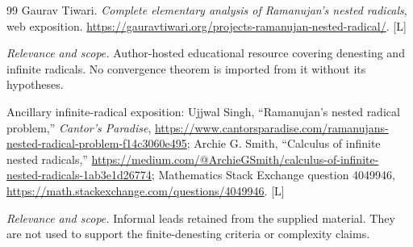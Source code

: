 \documentclass[11pt,oneside]{article}
\numberwithin{equation}{section}
\theoremstyle{definition}
\theoremstyle{remark}
\newcommand{\status}[1]{\textsf{\small[#1]}}
\newcommand{\entrynote}[1]{\par\smallskip\noindent\emph{Relevance and scope.} #1}
\begin{document}
\begin{thebibliography}{99}
Gaurav Tiwari. \emph{Complete elementary analysis of Ramanujan's nested radicals}, web exposition. \url{https://gauravtiwari.org/projects-ramanujan-nested-radical/}. \status{L}
\entrynote{Author-hosted educational resource covering denesting and infinite radicals. No convergence theorem is imported from it without its hypotheses.}

Ancillary infinite-radical exposition: Ujjwal Singh, ``Ramanujan's nested radical problem,'' \emph{Cantor's Paradise}, \url{https://www.cantorsparadise.com/ramanujans-nested-radical-problem-f14c3060e495}; Archie G. Smith, ``Calculus of infinite nested radicals,'' \url{https://medium.com/@ArchieGSmith/calculus-of-infinite-nested-radicals-1ab3e1d26774}; Mathematics Stack Exchange question 4049946, \url{https://math.stackexchange.com/questions/4049946}. \status{L}
\entrynote{Informal leads retained from the supplied material. They are not used to support the finite-denesting criteria or complexity claims.}

\end{thebibliography}
\end{document}
